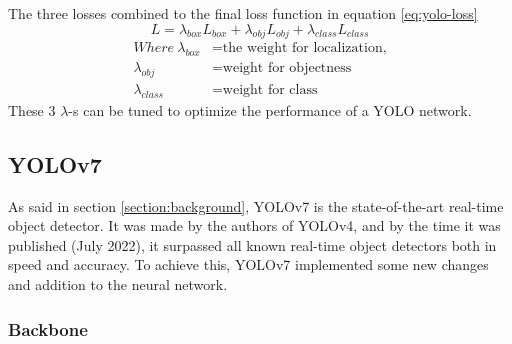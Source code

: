     The three losses combined to the final loss function in equation \ref{eq:yolo-loss}
    \begin{equation}
      L = \lambda_{box}L_{box} + \lambda_{obj}L_{obj} + \lambda_{class}L_{class}
      \label{eq:yolo-loss}
    \end{equation}
    \begin{align*}
      Where~\lambda_{box} &= \text{the weight for localization,}\\
      \lambda_{obj} &= \text{weight for objectness}\\
      \lambda_{class} &= \text{weight for class}
    \end{align*}
    These 3 $\lambda$-s can be tuned to optimize the performance of a YOLO network.



  
      
  \subsection{YOLOv7}
  As said in section \ref{section:background}, YOLOv7 is the state-of-the-art real-time object detector.
  It was made by the authors of YOLOv4, and by the time it was published (July 2022), it surpassed all 
  known real-time object detectors both in speed and accuracy. To achieve this, YOLOv7 implemented some new
  changes and addition to the neural network. 
  \subsubsection{Backbone}

